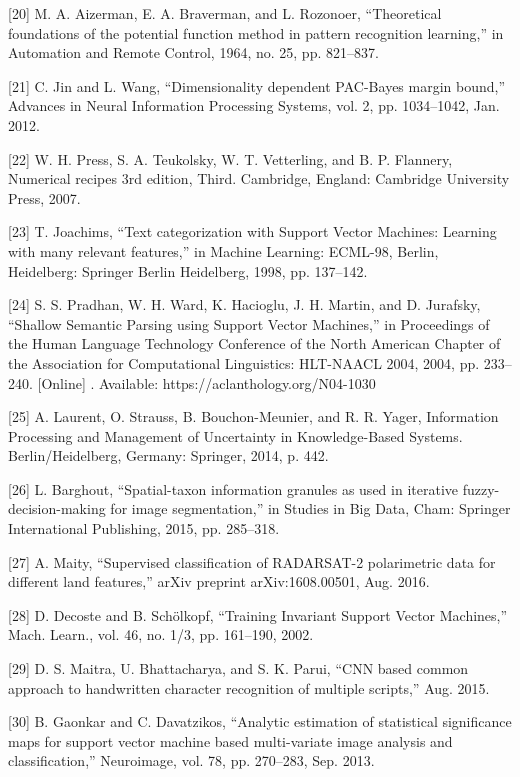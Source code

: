 \documentclass[sn-mathphys-num]{sn-jnl}%
\begin{document}
[20] M. A. Aizerman, E. A. Braverman, and L. Rozonoer, “Theoretical foundations of the potential function method in pattern recognition learning,” in Automation and Remote Control, 1964, no. 25, pp. 821–837.

[21] C. Jin and L. Wang, “Dimensionality dependent PAC-Bayes margin bound,” Advances in Neural Information Processing Systems, vol. 2, pp. 1034–1042, Jan. 2012.

[22] W. H. Press, S. A. Teukolsky, W. T. Vetterling, and B. P. Flannery, Numerical recipes 3rd edition, Third. Cambridge, England: Cambridge University Press, 2007.

[23] T. Joachims, “Text categorization with Support Vector Machines: Learning with many relevant features,” in Machine Learning: ECML-98, Berlin, Heidelberg: Springer Berlin Heidelberg, 1998, pp. 137–142.

[24] S. S. Pradhan, W. H. Ward, K. Hacioglu, J. H. Martin, and D. Jurafsky, “Shallow Semantic Parsing using Support Vector Machines,” in Proceedings of the Human Language Technology Conference of the North American Chapter of the Association for Computational Linguistics: HLT-NAACL 2004, 2004, pp. 233–240. [Online] . Available: https://aclanthology.org/N04-1030

[25] A. Laurent, O. Strauss, B. Bouchon-Meunier, and R. R. Yager, Information Processing and Management of Uncertainty in Knowledge-Based Systems. Berlin/Heidelberg, Germany: Springer, 2014, p. 442.

[26] L. Barghout, “Spatial-taxon information granules as used in iterative fuzzy-decision-making for image segmentation,” in Studies in Big Data, Cham: Springer International Publishing, 2015, pp. 285–318.

[27] A. Maity, “Supervised classification of RADARSAT-2 polarimetric data for different land features,” arXiv preprint arXiv:1608.00501, Aug. 2016.

[28] D. Decoste and B. Schölkopf, “Training Invariant Support Vector Machines,” Mach. Learn., vol. 46, no. 1/3, pp. 161–190, 2002.

[29] D. S. Maitra, U. Bhattacharya, and S. K. Parui, “CNN based common approach to handwritten character recognition of multiple scripts,” Aug. 2015.

[30] B. Gaonkar and C. Davatzikos, “Analytic estimation of statistical significance maps for support vector machine based multi-variate image analysis and classification,” Neuroimage, vol. 78, pp. 270–283, Sep. 2013.
\end{document}
